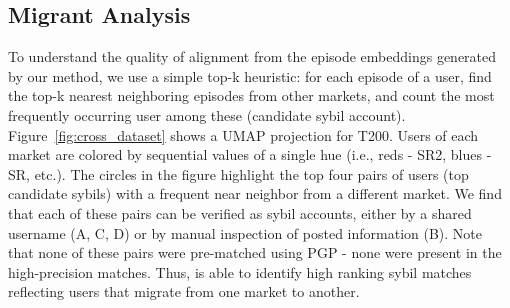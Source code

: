 \subsection{Migrant Analysis}
To understand the quality of alignment from the episode embeddings generated by our method, we use a simple top-k heuristic: for each episode of a user, find the top-k nearest neighboring episodes from other markets, and count the most frequently occurring user among these (candidate sybil account).
Figure~\ref{fig:cross_dataset} shows a UMAP projection for T200. 
Users of each market are colored by sequential values of a single hue (i.e., reds - SR2, blues - SR, etc.).
The circles in the figure highlight the top four pairs of users (top candidate sybils) with a frequent near neighbor from a different market. 
We find that each of these pairs can be verified as sybil accounts, either by a shared username (A, C, D) or by manual inspection of posted information (B).   
Note that none of these pairs were pre-matched using PGP - none were present in the high-precision matches. Thus,
\SYSMLmethodname{} is able to identify high ranking sybil matches reflecting users that migrate from one market to another.

